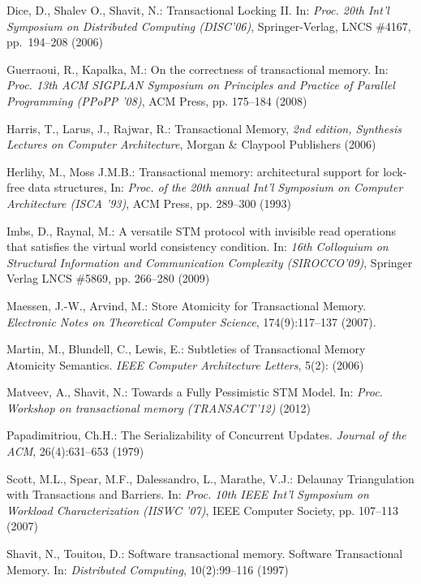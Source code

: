 \documentclass[runningheads,a4paper]{llncs}
\begin{document}
\begin{thebibliography}{4}
Dice, D., Shalev O., Shavit, N.:
Transactional Locking II.
In: {\em Proc. 20th Int'l Symposium on Distributed Computing (DISC'06)},
Springer-Verlag, LNCS \#4167, pp.~194--208 (2006)

Guerraoui, R., Kapalka, M.:  On the correctness of transactional memory. 
In: {\it  Proc. 13th ACM SIGPLAN Symposium on Principles and Practice of 
Parallel Programming (PPoPP '08)},  ACM Press, pp.  175--184 (2008)

 Harris, T.,  Larus, J.,  Rajwar, R.:
Transactional Memory, 
{\it 2nd edition, Synthesis Lectures on Computer Architecture},
Morgan \& Claypool Publishers (2006)

Herlihy, M., Moss J.M.B.: Transactional memory: architectural support for lock-free data structures, 
In: {\it Proc.  of the 20th annual Int'l Symposium on Computer Architecture 
(ISCA '93)}, ACM Press, pp. 289--300 (1993)

Imbs, D., Raynal, M.: 
A versatile   STM protocol with invisible read operations 
that satisfies  the  virtual world consistency condition.
In: {\it   16th  Colloquium   on  Structural   Information   and  Communication Complexity  (SIROCCO'09)}, 
Springer Verlag LNCS   \#5869, pp. 266--280 (2009)

 Maessen, J.-W., Arvind, M.:
 Store Atomicity for Transactional Memory. 
{\it Electronic  Notes  on Theoretical  Computer Science}, 
174(9):117--137 (2007).

 Martin, M.,  Blundell, C., Lewis, E.:
 Subtleties of Transactional Memory Atomicity Semantics. 
{\it IEEE Computer Architecture  Letters},  5(2):  (2006)

Matveev, A.,  Shavit, N.:
Towards a Fully Pessimistic STM Model. 
In: {\it Proc. Workshop on transactional memory (TRANSACT'12)} (2012)

Papadimitriou, Ch.H.:
The Serializability of Concurrent Updates. 
{\it Journal of the ACM},  26(4):631--653 (1979) 

 Scott, M.L.,  Spear, M.F., Dalessandro, L.,   Marathe, V.J.:
 Delaunay Triangulation with Transactions and Barriers. 
In: {\it Proc.  10th IEEE Int'l Symposium on Workload Characterization (IISWC '07)},
 IEEE Computer Society, pp. 107--113 (2007)

 Shavit, N., Touitou, D.: Software transactional memory. 
Software Transactional Memory. 
In: {\it Distributed  Computing}, 10(2):99--116 (1997) 


\end{thebibliography}
\end{document}
